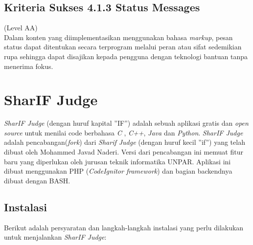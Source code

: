 \subsection{Kriteria Sukses 4.1.3 Status Messages}
\label{subsec:kriteria_4.1.3}
(Level AA) \\

Dalam konten yang diimplementasikan menggunakan bahasa \textit{markup}, pesan status dapat ditentukan secara terprogram melalui peran atau sifat sedemikian rupa sehingga dapat disajikan kepada pengguna dengan teknologi bantuan tanpa menerima fokus.

\section{SharIF Judge}
\label{sec:SharIF_Judge}
\textit{SharIF Judge} \cite{SharIF_Judge} (dengan huruf kapital ''IF'') adalah sebuah aplikasi gratis dan \textit{open source} untuk menilai code berbahasa \textit{C} , \textit{C++}, \textit{Java} dan \textit{Python}. \textit{SharIF Judge} adalah pencabangan(\textit{fork}) dari \textit{Sharif Judge} \cite{Sharif_Judge_Original} (dengan huruf kecil ''if'') yang telah dibuat oleh Mohammed Javad Naderi. Versi dari pencabangan ini memuat fitur baru yang diperlukan oleh jurusan teknik informatika UNPAR. Aplikasi ini dibuat menggunakan PHP (\textit{CodeIgnitor framework})\cite{Codeigniter} dan bagian backendnya dibuat dengan BASH.

\subsection{Instalasi}
\label{subsec:instalasi}
Berikut adalah persyaratan dan langkah-langkah instalasi yang perlu dilakukan untuk menjalankan \textit{SharIF Judge}:

